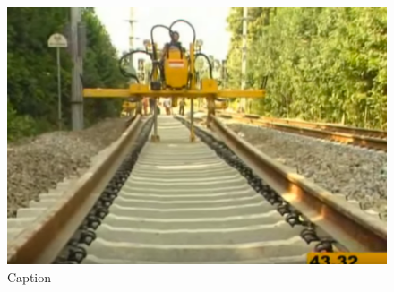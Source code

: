 \begin{figure}[h!]
\begin{minipage}[b]{0.3\linewidth}
    \includegraphics[width=\linewidth]{application-img/app 3.png} 
    \caption{Caption} 
    \label{fig:app3}
    \vspace{4ex}
  \end{minipage} %
\end{figure}